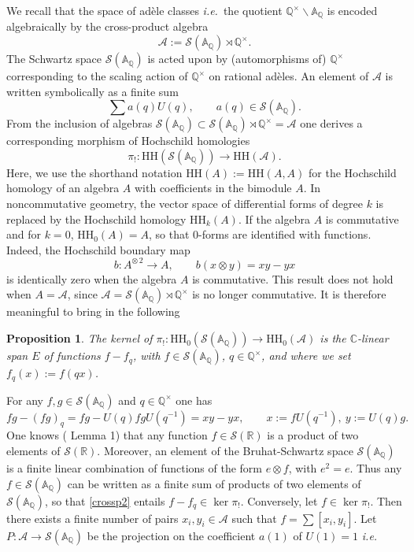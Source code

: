 \documentclass{pspum-l}
\newtheorem{proposition}[theorem]{Proposition}
\theoremstyle{definition}
\theoremstyle{remark}
\numberwithin{equation}{section}
\newcommand{\ie}{{\it i.e.\/}\ }
\def\A{{\mathbb A}}
\def\C{{\mathbb C}}
\def\Q{{\mathbb Q}}
\def\R{{\mathbb R}}
\def\cA{{\mathcal A}}
\def\cS{{\mathcal S}}
\def\HH{\text{HH}}
\begin{document}
 We recall that the space of ad\`ele classes \ie the quotient  $\Q^\times\backslash \A_\Q$ is encoded algebraically by the cross-product algebra
\begin{equation*}\label{crossp}
 \cA:=\cS(\A_\Q)\rtimes  \Q^\times.
 \end{equation*}
 The Schwartz space $\cS(\A_\Q)$ is acted upon by (automorphisms of) $\Q^\times$ corresponding to the scaling action of  $\Q^\times$ on rational ad\`eles. An element of $\cA$ is written symbolically as a finite sum
 \[
 \sum a(q)U(q), \qquad a(q)\in \cS(\A_\Q).
 \]
 From the inclusion of algebras $\cS(\A_\Q)\subset \cS(\A_\Q)\rtimes  \Q^\times= \cA$ one derives  a corresponding morphism of Hochschild homologies 
 \begin{equation*}\label{crossp1}
\pi_!: \text{HH}(\cS(\A_\Q))\longrightarrow \text{HH}(\cA).
\end{equation*}
 Here, we use the shorthand notation $\text{HH}(A):=\text{HH}(A,A)$ for the Hochschild homology of an algebra $A$ with coefficients in the bimodule $A$. In  noncommutative geometry, the vector space of differential forms of degree $k$ is replaced by the Hochschild homology $\HH_k(A)$. If the algebra $A$ is commutative and for $k=0$,  $\HH_0(A)=A$, so that  $0$-forms are identified with functions. Indeed, the Hochschild boundary map
 \[
 b:A^{\otimes\, 2}\to A, \qquad b(x\otimes y)=xy-yx
 \]
 is identically zero when the algebra $A$ is commutative. This result does not hold when $A=\cA$, since   $\cA=\cS(\A_\Q)\rtimes  \Q^\times$ is  no longer commutative. It is therefore meaningful to bring in the following
 \begin{proposition}\label{h0coinv} The kernel of  $\pi_!: \HH_0(\cS(\A_\Q))\to \HH_0(\cA)$ is the $\C$-linear span $E$ of functions  $f-f_q$, with $f\in \cS(\A_\Q)$, $q\in \Q^\times$, and where we set $f_q(x):=f(qx)$. 	
 \end{proposition}
 \proof For any $f,g\in \cS(\A_\Q)$ and  $q\in \Q^\times$ one has 
 \begin{equation}\label{crossp2}
 fg-(fg)_q=fg-U(q)fg U(q^{-1})=xy-yx, \qquad x:=f U(q^{-1}), \ y:=U(q)g.
 \end{equation}
One knows (\cite{Miyazaki} Lemma 1) that any function $f\in \cS(\R)$ is a product of two elements of $\cS(\R)$. Moreover, an element of the Bruhat-Schwartz space $\cS(\A_\Q)$ is  a finite linear combination of functions of the form $e\otimes f$, with $e^2=e$. Thus any $f\in \cS(\A_\Q)$ can be written as a finite sum of products of two elements of  $\cS(\A_\Q)$, so that \eqref{crossp2} entails $f-f_q\in \ker \pi_!$. Conversely, let  $f\in \ker \pi_!$. Then there exists a finite number of pairs $x_i, y_i \in \cA$ such that $f=\sum [x_i,y_i]$. Let $P: \cA\to \cS(\A_\Q)$ be the projection on the coefficient $a(1)$ of $U(1)=1$ \ie
\end{document}
